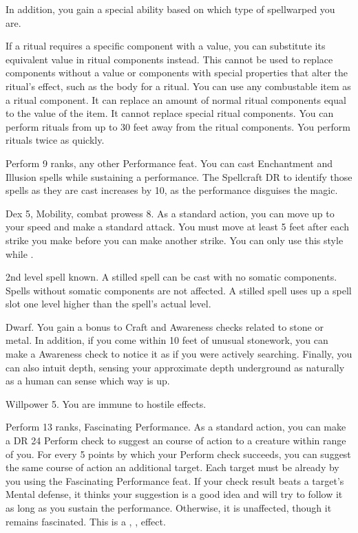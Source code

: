 In addition, you gain a special ability based on which type of spellwarped you are.

 If a ritual requires a specific component with a value, you can substitute its equivalent value in ritual components instead.
This cannot be used to replace components without a value or components with special properties that alter the ritual's effect, such as the body for a  ritual.
You can use any combustable item as a ritual component.
It can replace an amount of normal ritual components equal to the value of the item.
It cannot replace special ritual components.
You can perform rituals from up to 30 feet away from the ritual components.
You perform rituals twice as quickly.

\featpres Perform 9 ranks, any other Performance feat.
\featben You can cast Enchantment and Illusion spells while sustaining a performance.
The Spellcraft DR to identify those spells as they are cast increases by 10, as the performance disguises the magic.

\featpres Dex 5, Mobility, combat prowess 8.
\featben As a standard action, you can move up to your speed and make a standard attack.
You must move at least 5 feet after each strike you make before you can make another strike.
You can only use this style while \unencumbered.

\featpre 2nd level spell known.
\featben A stilled spell can be cast with no somatic components.
Spells without somatic components are not affected.
A stilled spell uses up a spell slot one level higher than the spell's actual level.

\featpre Dwarf.
\featben You gain a  bonus to Craft and Awareness checks related to stone or metal.
In addition, if you come within 10 feet of unusual stonework, you can make a Awareness check to notice it as if you were actively searching.
Finally, you can also intuit depth, sensing your approximate depth underground as naturally as a human can sense which way is up.

\featpre Willpower 5.
\featben You are immune to hostile  effects.

\featpres Perform 13 ranks, Fascinating Performance.
\featben As a standard action, you can make a DR 24 Perform check to suggest an course of action to a creature within \rngmed range of you.
For every 5 points by which your Perform check succeeds, you can suggest the same course of action an additional target.
Each target must be already \fascinated by you using the Fascinating Performance feat.
If your check result beats a target's Mental defense, it thinks your suggestion is a good idea and will try to follow it as long as you sustain the performance.
Otherwise, it is unaffected, though it remains fascinated.
This is a , ,  effect.

